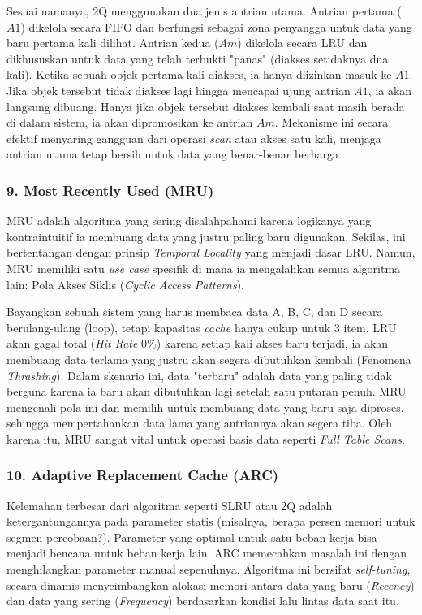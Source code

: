Sesuai namanya, 2Q menggunakan dua jenis antrian utama.
Antrian pertama ($A1$) dikelola secara FIFO dan berfungsi sebagai
zona penyangga untuk data yang baru pertama kali dilihat.
Antrian kedua ($Am$) dikelola secara LRU dan dikhususkan untuk data
yang telah terbukti "panas" (diakses setidaknya dua kali).
Ketika sebuah objek pertama kali diakses, ia hanya diizinkan masuk ke $A1$.
Jika objek tersebut tidak diakses lagi hingga mencapai ujung antrian
$A1$, ia akan langsung dibuang.
Hanya jika objek tersebut diakses kembali saat masih berada di dalam
sistem, ia akan dipromosikan ke antrian $Am$.
Mekanisme ini secara efektif menyaring gangguan dari operasi
\textit{scan} atau akses satu kali, menjaga antrian utama tetap
bersih untuk data yang benar-benar berharga.

\subsubsection{9. Most Recently Used (MRU)}
MRU adalah algoritma yang sering disalahpahami karena logikanya yang
kontraintuitif
ia membuang data yang justru paling baru digunakan.
Sekilas, ini bertentangan dengan prinsip \textit{Temporal Locality}
yang menjadi dasar LRU.
Namun, MRU memiliki satu \textit{use case} spesifik di mana ia
mengalahkan semua algoritma lain: Pola Akses Siklis (\textit{Cyclic
Access Patterns}).

Bayangkan sebuah sistem yang harus membaca data A, B, C, dan D secara
berulang-ulang (loop), tetapi kapasitas \textit{cache} hanya cukup untuk 3 item.
LRU akan gagal total (\textit{Hit Rate} 0\%) karena setiap kali akses
baru terjadi, ia akan membuang data terlama yang justru akan segera
dibutuhkan kembali (Fenomena \textit{Thrashing}).
Dalam skenario ini, data "terbaru" adalah data yang paling tidak
berguna karena ia baru akan dibutuhkan lagi setelah satu putaran penuh.
MRU mengenali pola ini dan memilih untuk membuang data yang baru saja
diproses, sehingga mempertahankan data lama yang antriannya akan segera tiba.
Oleh karena itu, MRU sangat vital untuk operasi basis data seperti
\textit{Full Table Scans}.

\subsubsection{10. Adaptive Replacement Cache (ARC)}
Kelemahan terbesar dari algoritma seperti SLRU atau 2Q adalah
ketergantungannya pada parameter statis (misalnya, berapa persen
memori untuk segmen percobaan?).
Parameter yang optimal untuk satu beban kerja bisa menjadi bencana
untuk beban kerja lain.
ARC memecahkan masalah ini dengan menghilangkan parameter manual sepenuhnya.
Algoritma ini bersifat \textit{self-tuning}, secara dinamis
menyeimbangkan alokasi memori antara data yang baru
(\textit{Recency}) dan data yang sering (\textit{Frequency})
berdasarkan kondisi lalu lintas data saat itu.

